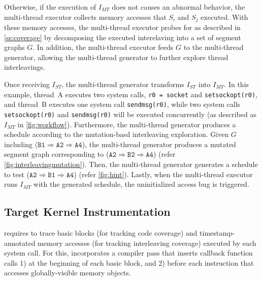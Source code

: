 Otherwise, if the execution of $I_{MT}$ does not causes an abnormal
behavior, the multi-thread executor collects memory accesses that
$S_i$ and $S_j$ executed.
%
With these memory accesses, the multi-thread executor probes for
\intcov as described in \autoref{ss:coverage} by decomposing the
executed interelaving into a set of segment graphs $G$. In addition,
the multi-thread executor feeds $G$ to the multi-thread generator,
allowing the multi-thread generator to further explore thread
interleavings.



%
Once receiving $I_{ST}$, the multi-thread generator transforms
$I_{ST}$ into $I_{MT}$. In this example, thread~A executes two system
calls, \texttt{r0 = socket{}} and \texttt{setsockopt(r0)}, and
thread~B executes one system call \texttt{sendmsg(r0)}, while two
system calls \texttt{setsockopt(r0)} and \texttt{sendmsg(r0)} will be
executed concurrently (as described as $I_{MT}$ in
\autoref{fig:workflow}).
%
Furthermore, the multi-thread generator produces a schedule according
to the mutation-basd interleaving exploration. Given $G$ including
($\texttt{B1} \Rightarrow \texttt{A2} \Rightarrow \texttt{A4}$), the
multi-thread generator produces a mutated segment graph corresponding
to ($\texttt{A2} \Rightarrow \texttt{B2} \Rightarrow \texttt{A4}$)
(refer \autoref{fig:interleavingmutation}). Then, the multi-thread
generator generates a schedule to test
($\texttt{A2} \Rightarrow \texttt{B1} \Rightarrow \texttt{A4}$) (refer
\autoref{fig:hint}).
%
Lastly, when the multi-thread executor runs $I_{MT}$ with the
generated schedule, the uninitialized access bug is triggered.



\subsection{Target Kernel Instrumentation}
\label{ss:instrumentation}

\sys requires to trace basic blocks (for tracking code coverage) and
timestamp-annotated memory accesses (for tracking interleaving
coverage) executed by each system call.
%
For this, \sys incorporates a compiler pass that inserts callback
function calls 1) at the beginning of each basic block, and 2) before
each instruction that accesses globally-visible memory objects.
%



